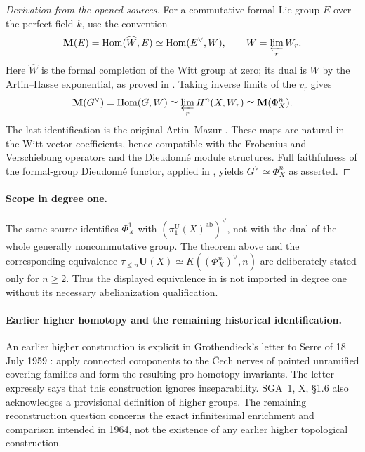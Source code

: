 \begin{proof}[Derivation from the opened sources]
For a commutative formal Lie group $E$ over the perfect field $k$,
use the convention
\[
 \mathbf M(E)=\operatorname{Hom}(\widehat W,E)
 \simeq\operatorname{Hom}(E^\vee,W),
 \qquad W=\varprojlim_rW_r.
\]
Here $\widehat W$ is the formal completion of the Witt group at zero;
its dual is $W$ by the Artin--Hasse exponential, as proved in
\cite[Lemma~6.3.4]{BMondalReinecke2026}.
Taking inverse limits of the $v_r$ gives
\[
 \mathbf M(G^\vee)
 =\operatorname{Hom}(G,W)
 \simeq\varprojlim_rH^n(X,W_r)
 \simeq\mathbf M(\Phi_X^n).
\]
The last identification is the original
Artin--Mazur \cite[II, Corollary~4.3, p.~110]{CArtinMazur1977}.
These maps are natural in the Witt-vector coefficients, hence
compatible with the Frobenius and Verschiebung operators and the
Dieudonn\'e module structures.  Full faithfulness of the formal-group
Dieudonn\'e functor, applied in
\cite[Proposition~6.3.6]{BMondalReinecke2026}, yields
$G^\vee\simeq\Phi_X^n$ as asserted.
\end{proof}

\paragraph{Scope in degree one.}
The same source identifies $\Phi_X^1$ with
$(\pi_1^{\mathrm U}(X)^{\mathrm{ab}})^\vee$, not with the dual of the
whole generally noncommutative group.  The theorem above and the
corresponding equivalence
$\tau_{\leq n}\mathbf U(X)\simeq K((\Phi_X^n)^\vee,n)$ are deliberately
stated only for $n\geq2$.  Thus the displayed equivalence in
\cite[Construction~6.3.7]{BMondalReinecke2026} is not imported in
degree one without its necessary abelianization qualification.


\paragraph{Earlier higher homotopy and the remaining historical identification.}
An earlier higher construction is explicit in Grothendieck's letter to
Serre of 18 July 1959 \cite[pp.~88--90]{A567_GrothendieckSerre2004}:
apply connected components to the \v Cech nerves of pointed unramified
covering families and form the resulting pro-homotopy invariants. The
letter expressly says that this construction ignores inseparability.
SGA~1, X, \S1.6 \cite[retyped p.~203; original p.~264]{A567_SGA1_2003}
also acknowledges a provisional definition of higher groups. The
remaining reconstruction question concerns the exact infinitesimal
enrichment and comparison intended in 1964, not the existence of any
earlier higher topological construction.


